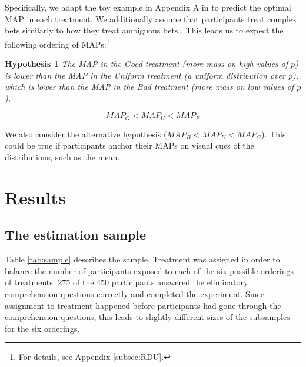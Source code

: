 Specifically, we adapt the toy example in Appendix A in \cite{Li2020a} to predict the optimal MAP in each treatment.
We additionally assume that participants treat complex bets similarly to how they treat ambiguous bets \cite[for supporting evidence, see][]{Armantier2016}.
This leads us to expect the following ordering of MAPs:\footnote{
For details, see Appendix \ref{subsec:RDU}.
}

\noindent \textbf{Hypothesis 1} \quad \textit{The MAP in the Good treatment (more mass on high values of $p$) is lower than the MAP in the Uniform treatment (a uniform distribution over $p$), which is lower than the MAP in the Bad treatment (more mass on low values of $p$).}

\begin{equation}
MAP_G < MAP_U < MAP_B
\end{equation}

We also consider the alternative hypothesis ($MAP_B < MAP_U < MAP_G$).
This could be true if participants anchor their MAPs on visual cues of the distributions, such as the mean.


\section{Results}\label{sec:results}
\subsection{The estimation sample}\label{ssec:sample}

Table \ref{tab:sample} describes the sample.
Treatment was assigned in order to balance the number of participants exposed to each of the six possible orderings of treatments.
275 of the 450 participants answered the eliminatory comprehension questions correctly and completed the experiment.
Since assignment to treatment happened before participants had gone through the comprehension questions, this leads to slightly different sizes of the subsamples for the six orderings.

